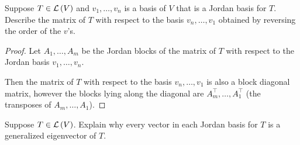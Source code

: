 \begin{exercise}\label{chapter8:sectionC:exercise10}
    Suppose $T \in \mathcal{L}\left({V}\right)$ and $v_{1}, \ldots, v_{n}$ is a basis of $V$ that is a Jordan basis for $T$. Describe the matrix of $T$ with respect to the basis $v_{n}, \ldots, v_{1}$ obtained by reversing the order of the $v$'s.
\end{exercise}

\begin{proof}
    Let $A_{1}, \ldots, A_{m}$ be the Jordan blocks of the matrix of $T$ with respect to the Jordan basis $v_{1}, \ldots, v_{n}$.

    Then the matrix of $T$ with respect to the basis $v_{n}, \ldots, v_{1}$ is also a block diagonal matrix, however the blocks lying along the diagonal are ${A_{m}^{\top}}, \ldots, {A_{1}^{\top}}$ (the transposes of $A_{m}, \ldots, A_{1}$).
\end{proof}
\newpage

\begin{exercise}\label{chapter8:sectionC:exercise11}
    Suppose $T \in \mathcal{L}\left({V}\right)$. Explain why every vector in each Jordan basis for $T$ is a generalized eigenvector of $T$.
\end{exercise}

